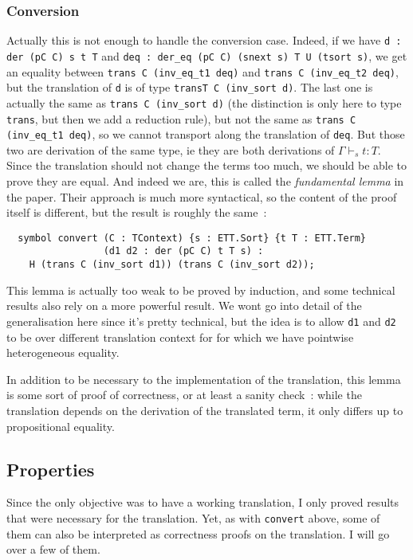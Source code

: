 \subsubsection{Conversion}\label{conversion}

Actually this is not enough to handle the conversion case. Indeed, if we have
\texttt{d : der (pC C) s t T} and \texttt{deq : der\_eq (pC C) (snext s) T U
(tsort s)}, we get an equality between \texttt{trans C (inv\_eq\_t1 deq)} and
\texttt{trans C (inv\_eq\_t2 deq)}, but the translation of \texttt{d} is of type
\texttt{transT C (inv\_sort d)}. The last one is actually the same as
\texttt{trans C (inv\_sort d)} (the distinction is only here to type
\texttt{trans}, but then we add a reduction rule), but not the same as
\texttt{trans C (inv\_eq\_t1 deq)}, so we cannot transport along the translation
of \texttt{deq}. But those two are derivation of the same type, ie they are both
derivations of $\Gamma\vdash_{s} t : T$. Since the translation should not change the terms
too much, we should be able to prove they are equal. And indeed we are, this is
called the \emph{fundamental lemma} in the paper. Their approach is much more
syntactical, so the content of the proof itself is different, but the result is
roughly the same~:

\begin{lstlisting}
  symbol convert (C : TContext) {s : ETT.Sort} {t T : ETT.Term}
                 (d1 d2 : der (pC C) t T s) :
    H (trans C (inv_sort d1)) (trans C (inv_sort d2));
\end{lstlisting}

This lemma is actually too weak to be proved by induction, and some technical
results also rely on a more powerful result. We wont go into detail of the
generalisation here since it's pretty technical, but the idea is to allow
\texttt{d1} and \texttt{d2} to be over different translation context for for
which we have pointwise heterogeneous equality.

In addition to be necessary to the implementation of the translation, this lemma
is some sort of proof of correctness, or at least a sanity check~: while the
translation depends on the derivation of the translated term, it only differs up
to propositional equality.

\subsection{Properties}

Since the only objective was to have a working translation, I only proved
results that were necessary for the translation. Yet, as with \texttt{convert}
above, some of them can also be interpreted as correctness proofs on the
translation. I will go over a few of them.

